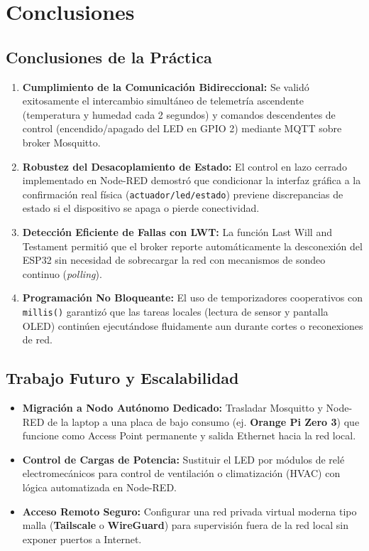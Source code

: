 \section{Conclusiones}

\subsection{Conclusiones de la Práctica}
\begin{enumerate}[noitemsep]
    \item \textbf{Cumplimiento de la Comunicación Bidireccional:} Se validó exitosamente el intercambio simultáneo de telemetría ascendente (temperatura y humedad cada 2 segundos) y comandos descendentes de control (encendido/apagado del LED en GPIO 2) mediante MQTT sobre broker Mosquitto.
    \item \textbf{Robustez del Desacoplamiento de Estado:} El control en lazo cerrado implementado en Node-RED demostró que condicionar la interfaz gráfica a la confirmación real física (\texttt{actuador/led/estado}) previene discrepancias de estado si el dispositivo se apaga o pierde conectividad.
    \item \textbf{Detección Eficiente de Fallas con LWT:} La función Last Will and Testament permitió que el broker reporte automáticamente la desconexión del ESP32 sin necesidad de sobrecargar la red con mecanismos de sondeo continuo (\textit{polling}).
    \item \textbf{Programación No Bloqueante:} El uso de temporizadores cooperativos con \texttt{millis()} garantizó que las tareas locales (lectura de sensor y pantalla OLED) continúen ejecutándose fluidamente aun durante cortes o reconexiones de red.
\end{enumerate}

\subsection{Trabajo Futuro y Escalabilidad}
\begin{itemize}[noitemsep]
    \item \textbf{Migración a Nodo Autónomo Dedicado:} Trasladar Mosquitto y Node-RED de la laptop a una placa de bajo consumo (ej. \textbf{Orange Pi Zero 3}) que funcione como Access Point permanente y salida Ethernet hacia la red local.
    \item \textbf{Control de Cargas de Potencia:} Sustituir el LED por módulos de relé electromecánicos para control de ventilación o climatización (HVAC) con lógica automatizada en Node-RED.
    \item \textbf{Acceso Remoto Seguro:} Configurar una red privada virtual moderna tipo malla (\textbf{Tailscale} o \textbf{WireGuard}) para supervisión fuera de la red local sin exponer puertos a Internet.
\end{itemize}
